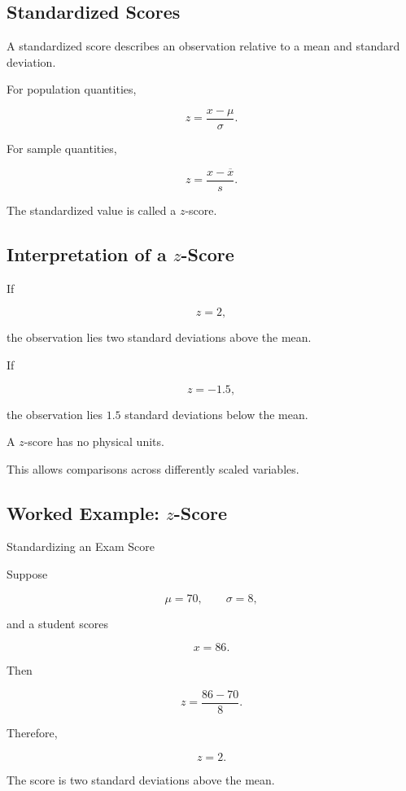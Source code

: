 \subsection{Standardized Scores}
\label{subsec:standardized-scores}

A standardized score describes an observation relative to a mean and
standard deviation.

For population quantities,

\[
\boxed{
z
=
\frac{x-\mu}{\sigma}.
}
\]

For sample quantities,

\[
\boxed{
z
=
\frac{x-\overline{x}}{s}.
}
\]

The standardized value is called a \(z\)-score.

\subsection{Interpretation of a \(z\)-Score}
\label{subsec:z-score-interpretation}

If

\[
z=2,
\]

the observation lies two standard deviations above the mean.

If

\[
z=-1.5,
\]

the observation lies \(1.5\) standard deviations below the mean.

A \(z\)-score has no physical units.

This allows comparisons across differently scaled variables.

\subsection{Worked Example: \(z\)-Score}
\label{subsec:worked-z-score}

\begin{workedexamplebox}{Standardizing an Exam Score}

Suppose

\[
\mu=70,
\qquad
\sigma=8,
\]

and a student scores

\[
x=86.
\]

Then

\[
z
=
\frac{86-70}{8}.
\]

Therefore,

\begin{answerbox}
\[
\boxed{
z=2.
}
\]
\end{answerbox}

The score is two standard deviations above the mean.

\end{workedexamplebox}

